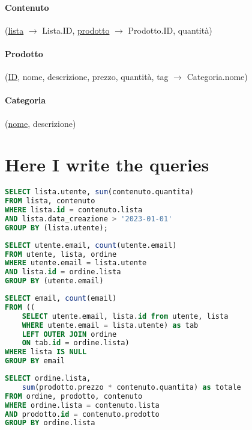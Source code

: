 \documentclass[11pt]{article}
\begin{document}
\paragraph{Contenuto}(\underline{lista} $\rightarrow$ Lista.ID,
\underline{prodotto} $\rightarrow$ Prodotto.ID, quantità)

\paragraph{Prodotto}(\underline{ID}, nome, descrizione, prezzo, quantità, tag
$\rightarrow$ Categoria.nome)

\paragraph{Categoria}(\underline{nome}, descrizione)


\section{Here I write the queries}

\begin{lstlisting}[language=SQL]
SELECT lista.utente, sum(contenuto.quantita)
FROM lista, contenuto
WHERE lista.id = contenuto.lista 
AND lista.data_creazione > '2023-01-01'
GROUP BY (lista.utente);
\end{lstlisting}





\begin{lstlisting}[language=SQL]
SELECT utente.email, count(utente.email)
FROM utente, lista, ordine
WHERE utente.email = lista.utente
AND lista.id = ordine.lista
GROUP BY (utente.email)
\end{lstlisting}




\begin{lstlisting}[language=SQL]
SELECT email, count(email) 
FROM ((
	SELECT utente.email, lista.id from utente, lista
	WHERE utente.email = lista.utente) as tab
	LEFT OUTER JOIN ordine
	ON tab.id = ordine.lista)
WHERE lista IS NULL
GROUP BY email
\end{lstlisting}




\begin{lstlisting}[language=SQL]
SELECT ordine.lista, 
	sum(prodotto.prezzo * contenuto.quantita) as totale
FROM ordine, prodotto, contenuto
WHERE ordine.lista = contenuto.lista
AND prodotto.id = contenuto.prodotto
GROUP BY ordine.lista
\end{lstlisting}
\end{document}
